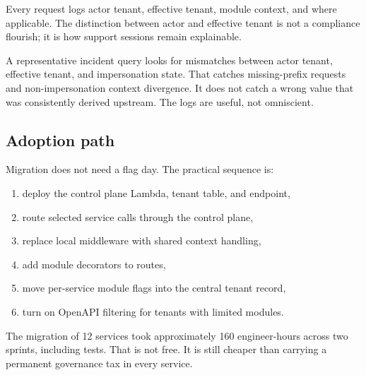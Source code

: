 Every request logs actor tenant, effective tenant, module context, and \scopeprefix{} where applicable. The distinction between actor and effective tenant is not a compliance flourish; it is how support sessions remain explainable.

A representative incident query looks for mismatches between actor tenant, effective tenant, and impersonation state. That catches missing-prefix requests and non-impersonation context divergence. It does not catch a wrong value that was consistently derived upstream. The logs are useful, not omniscient.

\subsection{Adoption path}

Migration does not need a flag day. The practical sequence is:

\begin{enumerate}
  \item deploy the control plane Lambda, tenant table, and  endpoint,
  \item route selected service calls through the control plane,
  \item replace local middleware with shared context handling,
  \item add module decorators to routes,
  \item move per-service module flags into the central tenant record,
  \item turn on OpenAPI filtering for tenants with limited modules.
\end{enumerate}

The migration of 12 services took approximately 160 engineer-hours across two sprints, including tests. That is not free. It is still cheaper than carrying a permanent governance tax in every service.
